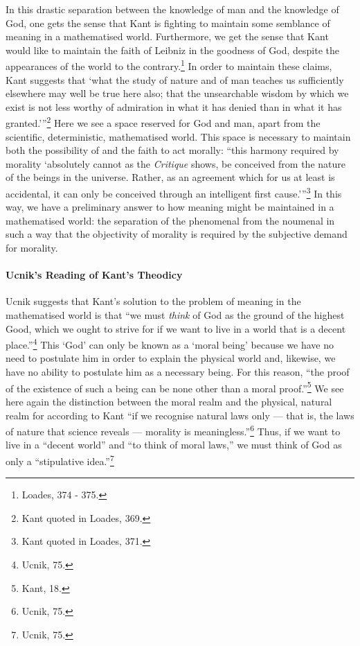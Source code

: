 \documentclass[12pt]{article}
\begin{document}
	
	In this drastic separation between the knowledge of man and the knowledge of God, one gets the sense that Kant is fighting to maintain some semblance of meaning in a mathematised world. Furthermore, we get the sense that Kant would like to maintain the faith of Leibniz in the goodness of God, despite the appearances of the world to the contrary.\footnote{Loades, 374 - 375.} In order to maintain these claims, Kant suggests that `what the study of nature and of man teaches us sufficiently elsewhere may well be true here also; that the unsearchable wisdom by which we exist is not less worthy of admiration in what it has denied than in what it has granted.'\thinspace''\footnote{Kant quoted in Loades, 369.}  Here we see a space reserved for God and man, apart from the scientific, deterministic, mathematised world. This space is necessary to maintain both the possibility of and the faith to act morally: ``this harmony required by morality `absolutely cannot as the \emph{Critique} shows, be conceived from the nature of the beings in the universe. Rather, as an agreement which for us at least is accidental, it can only be conceived through an intelligent first cause.'\thinspace''\footnote{Kant quoted in Loades, 371.} In this way, we have a preliminary answer to how meaning might be maintained in a mathematised world: the separation of the phenomenal from the noumenal in such a way that the objectivity of morality is required by the subjective demand for morality.
	
	\paragraph*{Ucnik's Reading of Kant's Theodicy}  Ucnik suggests that Kant's solution to the problem of meaning in the mathematised world is that ``we must \emph{think} of God as the ground of the highest Good, which we ought to strive for if we want to live in a world that is a decent place.''\footnote{Ucnik, 75.} This `God' can only be known as a `moral being' because we have no need to postulate him in order to explain the physical world and, likewise, we have no ability to postulate him as a necessary being. For this reason, ``the proof of the existence of such a being can be none other than a moral proof.''\footnote{Kant, 18.} We see here again the distinction between the moral realm and the physical, natural realm for according to Kant ``if we recognise natural laws only --- that is, the laws of nature that science reveals --- morality is meaningless.''\footnote{Ucnik, 75.} Thus, if we want to live in a ``decent world'' and ``to think of moral laws,'' we must think of God as only a ``stipulative idea.''\footnote{Ucnik, 75.} 
	
\end{document}
